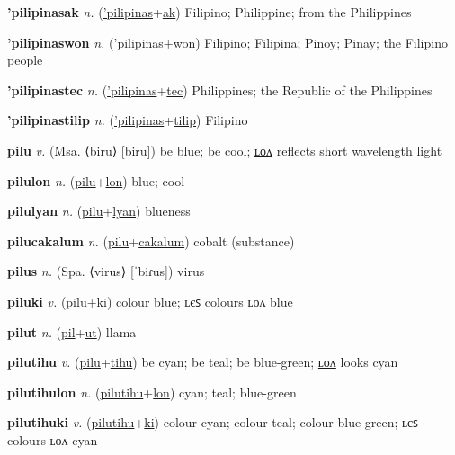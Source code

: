\textbf{\hypertarget{'pilipinasak}{'pilipinasak}} \textit{n.} (\hyperlink{'pilipinas}{'pilipinas}+\allowbreak \hyperlink{ak}{ak})
Filipino; Philippine; from the Philippines

\textbf{\hypertarget{'pilipinaswon}{'pilipinaswon}} \textit{n.} (\hyperlink{'pilipinas}{'pilipinas}+\allowbreak \hyperlink{won}{won})
Filipino; Filipina; Pinoy; Pinay; the Filipino people

\textbf{\hypertarget{'pilipinastec}{'pilipinastec}} \textit{n.} (\hyperlink{'pilipinas}{'pilipinas}+\allowbreak \hyperlink{tec}{tec})
Philippines; the Republic of the Philippines

\textbf{\hypertarget{'pilipinastilip}{'pilipinastilip}} \textit{n.} (\hyperlink{'pilipinas}{'pilipinas}+\allowbreak \hyperlink{tilip}{tilip})
Filipino

\textbf{\hypertarget{pilu}{pilu}} \textit{v.} (Msa. ⟨biru⟩ [biru])
be blue; be cool; \hyperlink{pilulon}{ʟᴏᴧ} reflects short wavelength light

\textbf{\hypertarget{pilulon}{pilulon}} \textit{n.} (\hyperlink{pilu}{pilu}+\allowbreak \hyperlink{lon}{lon})
blue; cool

\textbf{\hypertarget{pilulyan}{pilulyan}} \textit{n.} (\hyperlink{pilu}{pilu}+\allowbreak \hyperlink{lyan}{lyan})
blueness

\textbf{\hypertarget{pilucakalum}{pilucakalum}} \textit{n.} (\hyperlink{pilu}{pilu}+\allowbreak \hyperlink{cakalum}{cakalum})
cobalt (substance)

\textbf{\hypertarget{pilus}{pilus}} \textit{n.} (Spa. ⟨virus⟩ [ˈbiɾus])
virus

\textbf{\hypertarget{piluki}{piluki}} \textit{v.} (\hyperlink{pilu}{pilu}+\allowbreak \hyperlink{ki}{ki})
colour blue; ʟєꜱ colours ʟᴏᴧ blue

\textbf{\hypertarget{pilut}{pilut}} \textit{n.} (\hyperlink{pil}{pil}+\allowbreak \hyperlink{ut}{ut})
llama

\textbf{\hypertarget{pilutihu}{pilutihu}} \textit{v.} (\hyperlink{pilu}{pilu}+\allowbreak \hyperlink{tihu}{tihu})
be cyan; be teal; be blue-green; \hyperlink{pilutihulon}{ʟᴏᴧ} looks cyan

\textbf{\hypertarget{pilutihulon}{pilutihulon}} \textit{n.} (\hyperlink{pilutihu}{pilutihu}+\allowbreak \hyperlink{lon}{lon})
cyan; teal; blue-green

\textbf{\hypertarget{pilutihuki}{pilutihuki}} \textit{v.} (\hyperlink{pilutihu}{pilutihu}+\allowbreak \hyperlink{ki}{ki})
colour cyan; colour teal; colour blue-green; ʟєꜱ colours ʟᴏᴧ cyan

